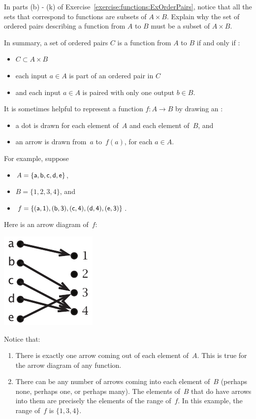\begin{exercise}{}
In parts (b) - (k) of Exercise~\ref{exercise:functions:ExOrderPairs}, notice that all the sets that correspond to functions are subsets of $A \times B$.  Explain why the set of ordered pairs describing a function from $A$ to $B$ must be a subset of $A \times B$.
\end{exercise}

In summary, a set of ordered pairs $C$ is a function from $A$ to $B$ if and only if :
\begin{itemize}
\item
$C \subset A \times B$
\item
each input $a \in A$ is part of an ordered pair in $C$
\item
and each input $a \in A$ is paired with only one output $b \in B$.
\end{itemize}

It is sometimes helpful to represent a function $f \colon A \to B$ by drawing an : 
\begin{itemize}
\item a dot is drawn for each element of~$A$ and each element of~$B$,
and
\item an arrow is drawn from~$a$ to~$f(a)$, for each $a \in A$.
\end{itemize}
For example, suppose 
\begin{itemize}
\item $A = \{\sf{a}, \sf{b}, \sf{c}, \sf{d}, \sf{e}\}$,
\item $B = \{1, 2, 3, 4\}$,
and
\item $f = \{ (\sf{a},1), (\sf{b}, 3), (\sf{c}, 4), (\sf{d},4), (\sf{e}, 3) \}$.
\end{itemize}
Here is an arrow diagram of~$f$:
\begin{center}
\includegraphics{images/arrowdiageg.pdf}
\end{center}
Notice that:
\begin{enumerate}
\item There is exactly one arrow coming out of each element of~$A$. This is true for the arrow diagram of any function.
\item There can be any number of arrows coming into each element of~$B$ (perhaps none, perhaps one, or perhaps many). The elements of~$B$ that do have arrows into them are precisely the elements of the range of~$f$. In this example, the range of~$f$ is $\{1,3,4\}$.
\end{enumerate}


